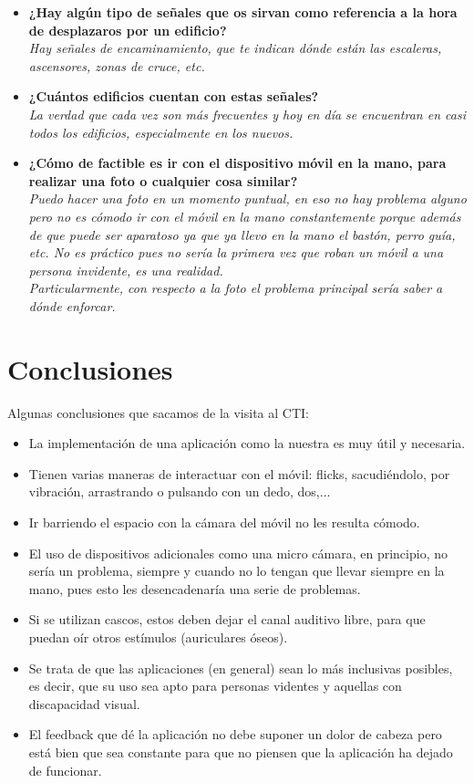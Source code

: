 \documentclass{article}
\begin{document}
\begin{itemize}
		\item \textbf{¿Hay algún tipo de señales que os sirvan como referencia a la hora de desplazaros por un edificio?}
		\\
		\textit{Hay señales de encaminamiento, que te indican dónde están las escaleras, ascensores, zonas de cruce, etc.}
		\\
		\item \textbf{¿Cuántos edificios cuentan con estas señales?}
		\\
		\textit{La verdad que cada vez son más frecuentes y hoy en día se encuentran en casi todos los edificios, especialmente en los nuevos.}
		\\
		\item \textbf{¿Cómo de factible es ir con el dispositivo móvil en la mano, para realizar una foto o cualquier cosa similar?}
		\\
		\textit{Puedo hacer una foto en un momento puntual, en eso no hay problema alguno pero no es cómodo ir con el móvil en la mano constantemente porque además de que puede ser aparatoso ya que ya llevo en la mano el bastón, perro guía, etc. No es práctico pues no sería la primera vez que roban un móvil a una persona invidente, es una realidad. 
		\\
		Particularmente, con respecto a la foto el problema principal sería saber a dónde enforcar.} 
		 
	\end{itemize}


	\section{Conclusiones}
	Algunas conclusiones que sacamos de la visita al CTI:
	
\begin{itemize}
	\item La implementación de una aplicación como la nuestra es muy útil y necesaria.
	\item Tienen varias maneras de interactuar con el móvil: flicks, sacudiéndolo, por vibración, arrastrando o pulsando con un dedo, dos,...
	\item Ir barriendo el espacio con la cámara del móvil no les resulta cómodo.
	\item El uso de dispositivos adicionales como una micro cámara, en principio, no sería un problema, siempre y cuando no lo tengan que llevar siempre en la mano, pues esto les desencadenaría una serie de problemas.
	\item Si se utilizan cascos, estos deben dejar el canal auditivo libre, para que puedan oír otros estímulos (auriculares óseos).
	\item Se trata de que las aplicaciones (en general) sean lo más inclusivas posibles, es decir, que su uso sea apto para personas videntes y aquellas con discapacidad visual.
	\item El feedback que dé la aplicación no debe suponer un dolor de cabeza pero está bien que sea constante para que no piensen que la aplicación ha dejado de funcionar.
\end{itemize}
	
	
\end{document}
